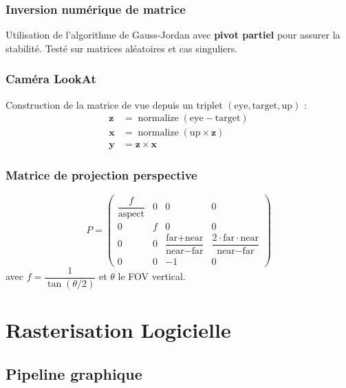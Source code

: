 \documentclass[11pt,a4paper]{article}
\begin{document}
\subsubsection{Inversion numérique de matrice}

Utilisation de l'algorithme de Gauss-Jordan avec \textbf{pivot partiel} pour assurer la stabilité. Testé sur matrices aléatoires et cas singuliers.

\subsubsection{Caméra LookAt}

Construction de la matrice de vue depuis un triplet $(\text{eye}, \text{target}, \text{up})$ :
\begin{align}
\mathbf{z} &= \operatorname{normalize}(\text{eye} - \text{target}) \\
\mathbf{x} &= \operatorname{normalize}(\text{up} \times \mathbf{z}) \\
\mathbf{y} &= \mathbf{z} \times \mathbf{x}
\end{align}

\subsubsection{Matrice de projection perspective}

\[
P = \begin{pmatrix}
\dfrac{f}{\text{aspect}} & 0 & 0 & 0 \\[8pt]
0 & f & 0 & 0 \\[6pt]
0 & 0 & \dfrac{\text{far}+\text{near}}{\text{near}-\text{far}} & \dfrac{2\cdot\text{far}\cdot\text{near}}{\text{near}-\text{far}} \\[8pt]
0 & 0 & -1 & 0
\end{pmatrix}
\]
avec $f = \dfrac{1}{\tan(\theta/2)}$ et $\theta$ le FOV vertical.

\newpage

\section{Rasterisation Logicielle}

\subsection{Pipeline graphique}
\end{document}
